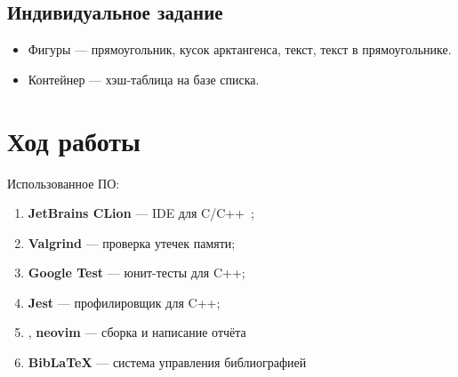 \documentclass[a4paper, 14pt]{extarticle}
\begin{document}
\subsection{Индивидуальное задание}
\begin{itemize}
    \item Фигуры --- прямоугольник, кусок арктангенса, текст, текст в прямоугольнике.
    \item Контейнер --- хэш-таблица на базе списка.
\end{itemize}

\section{Ход работы}
Использованное ПО:
\begin{enumerate}
    \item \textbf{JetBrains CLion} --- IDE для C/C++~\cite{clion};
    \item \textbf{Valgrind} --- проверка утечек памяти;
    \item \textbf{Google Test} --- юнит-тесты для C++;
    \item \textbf{Jest} --- профилировщик для C++;
    \item \XeLaTeX{}, \textbf{neovim} --- сборка и написание отчёта~\cite{latex}
    \item \textbf{BibLaTeX} --- система управления библиографией
\end{enumerate}
\end{document}
